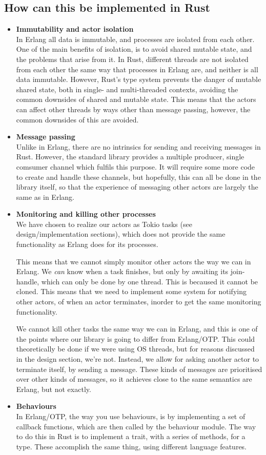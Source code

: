 \documentclass[a4paper]{article}
\begin{document}
\subsection{How can this be implemented in Rust}
\begin{itemize}
\item \textbf{Immutability and actor isolation}\\
  In Erlang all data is immutable, and processes are isolated from each other.
  One of the main benefits of isolation, is to avoid shared mutable state, and
  the problems that arise from it. In Rust, different threads are not isolated from
  each other the same way that processes in Erlang are, and neither is all data
  immutable. However, Rust's type system prevents the danger of mutable shared
  state, both in single- and multi-threaded contexts, avoiding the common downsides
  of shared and mutable state. This means that the actors can affect other
  threads by ways other than message passing, however, the common downsides of
  this are avoided.
\item \textbf{Message passing}\\
  Unlike in Erlang, there are no intrinsics for sending and receiving messages
  in Rust. However, the standard library provides a multiple producer, single
  comsumer channel which fulfils this purpose. It will require some more code
  to create and handle these channels, but hopefully, this can all be done in the
  library itself, so that the experience of messaging other actors are largely
  the same as in Erlang.
\item \textbf{Monitoring and killing other processes}\\
  We have chosen to realize our actors as Tokio tasks (see design/implementation
  sections), which does not provide the same functionality as Erlang does for
  its processes.

  This means that we cannot simply monitor other actors the way we can in
  Erlang. We \textit{can} know when a task finishes, but only by awaiting its
  join-handle, which can only be done by one thread. This is becaused it cannot
  be cloned. This means that we need to implement some system for notifying
  other actors, of when an actor terminates, inorder to get the same monitoring
  functionality.

  We cannot kill other tasks the same way we can in Erlang, and this is one of
  the points where our library is going to differ from Erlang/OTP. This could
  theoretically be done if we were using OS threads, but for reasons discussed
  in the design section, we're not. Instead, we allow for asking another actor
  to terminate itself, by sending a message. These kinds of messages are
  prioritised over other kinds of messages, so it achieves close to the same
  semantics are Erlang, but not exactly.
\item \textbf{Behaviours}\\
  In Erlang/OTP, the way you use behaviours, is by implementing a set of callback
  functions, which are then called by the behaviour module. The way to do this in
  Rust is to implement a trait, with a series of methods, for a type. These
  accomplish the same thing, using different language features.
\end{itemize}
\end{document}
